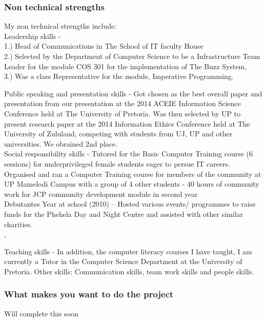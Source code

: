 \documentclass[hidelinks, 12pt, oneside]{article}
\begin{document}
\subsubsection{Non technical strengths}
My non technical strengths include: \\

Leadership skills - 
 \\1.) Head of Communications in The School of IT faculty House
 \\2.) Selected by the Department of Computer Science to be a 	Infrastructure Team Leader for the module COS 301 for the implementation of The Buzz System, 
 \\3.) Was a class Representative for the module, Imperative Programming.
   
Public speaking and presentation skills - Got chosen as the best overall paper and presentation from our presentation at the 2014 ACEIE Information Science Conference held at The University of Pretoria. Was then selected by UP to present research paper at the 2014 Information Ethics Conference held at The University of Zululand, competing with students from UJ, UP and other universities. We obrained 2nd place. 
\\
Social responsibility skills - Tutored for the Basic Computer Training course (6 sessions) for underprivileged female students eager to persue IT careers.\\ 
Organised and ran a Computer Training course for members of the community at UP Mamelodi Campus with a group of 4 other students - 40 hours of community work for JCP community development module in second year \\

Debutantes Year at school (2010) – Hosted various events/ programmes to raise funds for the Phehela Day and Night Centre and assisted with other similar charities.\\,

Teaching skills - In addition, the computer literacy courses I have taught, I am currently a Tutor in the Computer Science Department at the University of Pretoria.
Other skills: 
Communication skills, team work skills and people skills.

\subsubsection{What makes you want to do the project} 
Will complete this soon
\\
\end{document}
